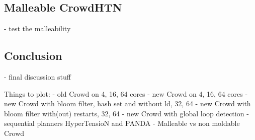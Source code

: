 \subsection{Malleable CrowdHTN}
\label{eval: malleable}
- test the malleability

\subsection{Conclusion}
\label{eval: conclusion}
- final discussion stuff

Things to plot:
- old Crowd on 4, 16, 64 cores
- new Crowd on 4, 16, 64 cores
- new Crowd with bloom filter, hash set and without ld, 32, 64
- new Crowd with bloom filter with(out) restarts, 32, 64
- new Crowd with global loop detection
- sequential planners HyperTensioN and PANDA
- Malleable vs non moldable Crowd

